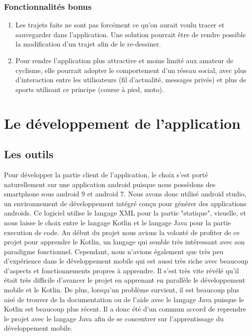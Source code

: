 \documentclass{article}
\begin{document}
\subsubsection{Fonctionnalités bonus}
\begin{enumerate}
  \item Les trajets faits ne sont pas forcément ce qu'on aurait voulu tracer et sauvegarder dans l'application. Une solution pourrait être de
  rendre possible la modification d'un trajet afin de le re-dessiner.
  \item Pour rendre l'application plus attractive et moins limité aux amateur de cyclisme, elle pourrait adopter le comportement d'un réseau
  social, avec plus d'interaction entre les utilisateurs (fil d'actualité, messages privés) et plus de sports utilisant ce principe (course à pied, moto).
\end{enumerate}


\section{Le développement de l'application}
\subsection{Les outils}
Pour développer la partie client de l'application, le choix s'est porté naturellement sur une application android puisque nous possèdons des
smartphone sous android 9 et android 7. Nous avons donc utilisé android studio, un environnement de développement intégré conçu pour générer
des applications androids. Ce logiciel utilise le langage XML pour la partie "statique", visuelle, et nous laisse le choix entre le langage
Kotlin et le langage Java pour la partie execution de code. Au début du projet nous avions la volonté de profiter de ce projet pour apprendre
le Kotlin, un langage qui semble très intéressant avec son paradigme fonctionnel. Cependant, nous n'avions également que très peu d'expérience
dans le développement mobile qui est aussi très riche avec beaucoup d'aspects et fonctionnements propres à apprendre. Il s'est très vite révélé
qu'il était très difficile d'avancer le projet en apprenant en parallèle le développement mobile et le Kotlin. De plus, lorsqu'un problème
survient, il est beaucoup plus aisé de trouver de la documentation ou de l'aide avec le langage Java puisque le Kotlin est beaucoup plus récent.
Il a donc été d'un commun accord de reprendre le projet avec le langage Java afin de se concentrer sur l'apprentissage du développement mobile.
\end{document}
